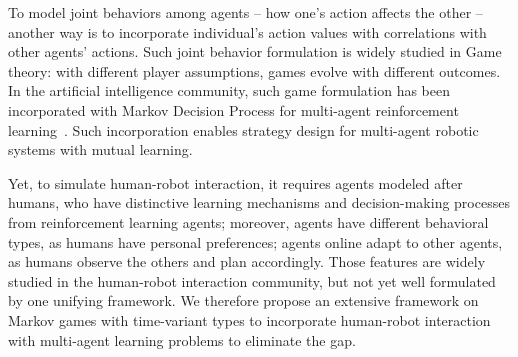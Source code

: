 \documentclass[letterpaper, 10 pt, conference]{ieeeconf}  %
\begin{document}


%



To model joint behaviors among agents -- how one's action affects the other -- another way is to incorporate individual's action values with correlations 
with other agents' actions. Such joint behavior formulation is widely studied 
in Game theory: with different player assumptions, games evolve with different 
outcomes. In the artificial intelligence community, such game 
formulation has been incorporated with Markov Decision Process for multi-agent 
reinforcement learning~\cite{littman1994markov}. Such incorporation enables strategy 
design for multi-agent robotic systems with mutual learning. 

Yet, to simulate human-robot interaction, it requires agents modeled after 
humans, who have distinctive learning mechanisms and decision-making processes 
from reinforcement learning agents; moreover, agents have different behavioral 
types, as humans have personal preferences; agents online adapt to other 
agents, as humans observe the others and plan accordingly. Those features are 
widely studied in the human-robot interaction community, but not yet well 
formulated by one unifying framework. We therefore propose 
an extensive framework on Markov games with time-variant types to incorporate 
human-robot interaction with multi-agent learning problems to eliminate the gap. 
\end{document}
